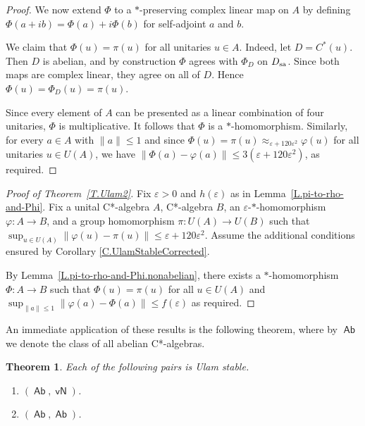\documentclass[11pt]{amsproc}
\newcommand{\cstar}{C*}
\DeclareMathOperator{\sfvN}{\mathsf {vN}}
\DeclareMathOperator{\sfCOM}{\mathsf {Ab}}
\theoremstyle{definition}
\theoremstyle{plain}
\newtheorem{theorem}[definition]{Theorem}
\theoremstyle{remark}
\begin{document}
\begin{proof}
	We now extend $\Phi$ to a $*$-preserving complex linear map on $A$ by defining $\Phi(a+ib)=\Phi(a)+i\Phi(b)$ for self-adjoint $a$ and $b$. 

We claim that $\Phi(u)=\pi(u)$ for all unitaries $u\in A$.
Indeed, let $D=C^*(u)$. Then $D$ is abelian, and by construction
$\Phi$ agrees with $\Phi_D$ on $D_{\rm sa}$. Since both maps are complex
linear, they agree on all of $D$. Hence
$
\Phi(u)=\Phi_D(u)=\pi(u).
$

Since every element of $A$ can be presented as a linear combination of four unitaries, 
	$\Phi$ is multiplicative. It follows that $\Phi$ is a $*$-homomorphism. Similarly, for every $a\in A$ with $\|a\|\leq 1$ and since $\Phi(u)=\pi(u) \approx_{\varepsilon + 120 \varepsilon^2} \varphi(u)$ for all unitaries $u\in U(A)$, we have $\|\Phi(a)-\varphi(a)\|\leq 3(\varepsilon + 120 \varepsilon^2)$, as required.
\end{proof}



\begin{proof}[Proof of Theorem~\ref{T.Ulam2}]
	Fix $\varepsilon>0$ and $h(\varepsilon)$ as in Lemma~\ref{L.pi-to-rho-and-Phi}. 
	Fix a unital \cstar-algebra $A$, \cstar-algebra $B$,  an $\varepsilon$-$*$-homomorphism $\varphi\colon A \to B$, and a group homomorphism $\pi\colon U(A)\to U(B)$ such that $\sup_{u\in U(A)} \|\varphi(u)-\pi(u)\|\leq \varepsilon+120\varepsilon^2$. Assume the additional conditions ensured by Corollary \ref{C.UlamStableCorrected}.
	
	By Lemma~\ref{L.pi-to-rho-and-Phi.nonabelian}, 
	there exists a $*$-homomorphism $\Phi\colon A\to B$ such that $\Phi(u)=\pi(u)$ for all $u\in U(A)$ and 
	\(\sup_{\|a\|\le 1}\|\varphi(a)-\Phi(a)\|\le f(\varepsilon)\)
	as required. 
\end{proof}


An immediate application of these results is the following theorem, where by $\sfCOM$ we denote  the class of all abelian \cstar-algebras. 

\begin{theorem} \label{T.Abelian+} Each of the following pairs is Ulam stable. 
	\begin{enumerate}
		\item \label{U.Abelian.vN} $(\sfCOM,\sfvN)$. 
		\item \label{U.Abelian.Abelian}
		$(\sfCOM,\sfCOM)$. 
	\end{enumerate}
\end{theorem}
\end{document}
